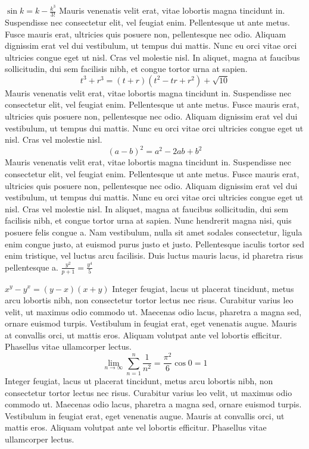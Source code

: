 \documentclass{article}
\begin{document}
\(
\sin {k}  =  k -\frac{k^{3}}{3!}
\)
Mauris venenatis velit erat, vitae lobortis magna tincidunt in. Suspendisse nec consectetur elit, vel feugiat enim. Pellentesque ut ante metus. Fusce mauris erat, ultricies quis posuere non, pellentesque nec odio. Aliquam dignissim erat vel dui vestibulum, ut tempus dui mattis. Nunc eu orci vitae orci ultricies congue eget ut nisl. Cras vel molestie nisl. In aliquet, magna at faucibus sollicitudin, dui sem facilisis nibh, et congue tortor urna at sapien.
\[ t^{3} + r^{3} = (t+r)(t^{2}-tr+r^{2}) + \sqrt{10} \]
Mauris venenatis velit erat, vitae lobortis magna tincidunt in. Suspendisse nec consectetur elit, vel feugiat enim. Pellentesque ut ante metus. Fusce mauris erat, ultricies quis posuere non, pellentesque nec odio. Aliquam dignissim erat vel dui vestibulum, ut tempus dui mattis. Nunc eu orci vitae orci ultricies congue eget ut nisl. Cras vel molestie nisl.
\begin{equation}
(a-b)^{2}=a^{2}-2ab+b^{2} 
\end{equation}
Mauris venenatis velit erat, vitae lobortis magna tincidunt in. Suspendisse nec consectetur elit, vel feugiat enim. Pellentesque ut ante metus. Fusce mauris erat, ultricies quis posuere non, pellentesque nec odio. Aliquam dignissim erat vel dui vestibulum, ut tempus dui mattis. Nunc eu orci vitae orci ultricies congue eget ut nisl. Cras vel molestie nisl. In aliquet, magna at faucibus sollicitudin, dui sem facilisis nibh, et congue tortor urna at sapien.
Nunc hendrerit magna nisi, quis posuere felis congue a. Nam vestibulum, nulla sit amet sodales consectetur, ligula enim congue justo, at euismod purus justo et justo. Pellentesque iaculis tortor sed enim tristique, vel luctus arcu facilisis. Duis luctus mauris lacus, id pharetra risus pellentesque a.
$\frac{ y^{2} }{ p+1 } = \frac{ y^{4} }{ 5 }$

\begin{math}
	x^{y}-y^{x} = (y - x)(x + y)
\end{math}
 Integer feugiat, lacus ut placerat tincidunt, metus arcu lobortis nibh, non consectetur tortor lectus nec risus. Curabitur varius leo velit, ut maximus odio commodo ut. Maecenas odio lacus, pharetra a magna sed, ornare euismod turpis. Vestibulum in feugiat erat, eget venenatis augue. Mauris at convallis orci, ut mattis eros. Aliquam volutpat ante vel lobortis efficitur. Phasellus vitae ullamcorper lectus.
$$
\lim_{n \to \infty}
\sum_{n=1}^n \frac{1}{n^2}
= \frac{\pi^2}{6} \cos{0} = 1
$$
 Integer feugiat, lacus ut placerat tincidunt, metus arcu lobortis nibh, non consectetur tortor lectus nec risus. Curabitur varius leo velit, ut maximus odio commodo ut. Maecenas odio lacus, pharetra a magna sed, ornare euismod turpis. Vestibulum in feugiat erat, eget venenatis augue. Mauris at convallis orci, ut mattis eros. Aliquam volutpat ante vel lobortis efficitur. Phasellus vitae ullamcorper lectus.
\end{document}
